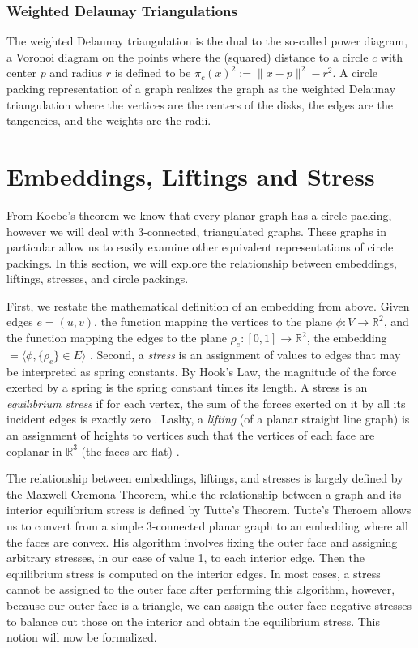 \documentclass[11pt]{article}
\newcommand{\R}{\mathbb{R}}
\theoremstyle{definition}
\begin{document}
\subsubsection{Weighted Delaunay Triangulations}
	The weighted Delaunay triangulation is the dual to the so-called power diagram, a Voronoi diagram on the points where the (squared) distance to a circle $c$ with center $p$ and radius $r$ is defined to be $\pi_c(x)^2 := \|x-p\|^2 - r^2$.
  	A circle packing representation of a graph realizes the graph as the weighted Delaunay triangulation where the vertices are the centers of the disks, the edges are the tangencies, and the weights are the radii.
  
\section{Embeddings, Liftings and Stress}
	
	From Koebe's theorem we know that every planar graph has a circle packing, however we will deal with 3-connected, triangulated graphs. 
	These graphs in particular allow us to easily examine other equivalent representations of circle packings. 
	In this section, we will explore the relationship between embeddings, liftings, stresses, and circle packings.

	First, we restate the mathematical definition of an embedding from above. 
	Given edges $e=(u,v)$, the function mapping the vertices to the plane $ \phi :V \rightarrow \R^2$, and the function mapping the edges to the plane $ \rho_e :[0,1] \rightarrow \R^2$, the embedding $= \langle \phi, \{\rho_e\} \in E \rangle$ \cite{mathworld:Embedding}.
	Second, a \emph{stress} is an assignment of values to edges that may be interpreted as spring constants. 
	By Hook's Law, the magnitude of the force exerted by a spring is the spring constant times its length. 
	A stress is an \emph{equilibrium stress} if for each vertex, the sum of the forces exerted on it by all its incident edges is exactly zero \cite{AresRiboMor}.
	Laslty, a \emph{lifting} (of a planar straight line graph) is an assignment of heights to vertices such that the vertices of each face are coplanar in $\R^3$ (the faces are flat) \cite{WhiteleyHandbook}.

  	The relationship between embeddings, liftings, and stresses is largely defined by the Maxwell-Cremona Theorem, while the relationship between a graph and its interior equilibrium stress is defined by Tutte's Theorem.  
	Tutte's Theroem allows us to convert from a simple 3-connected planar graph to an embedding where all the faces are convex. 
	His algorithm involves fixing the outer face and assigning arbitrary stresses, in our case of value 1, to each interior edge. 
	Then the equilibrium stress is computed on the interior edges. 
	In most cases, a stress cannot be assigned to the outer face after performing this algorithm, however, because our outer face is a triangle, we can assign the outer face negative stresses to balance out those on the interior and obtain the equilibrium stress. 
	This notion will now be formalized.
\end{document}
